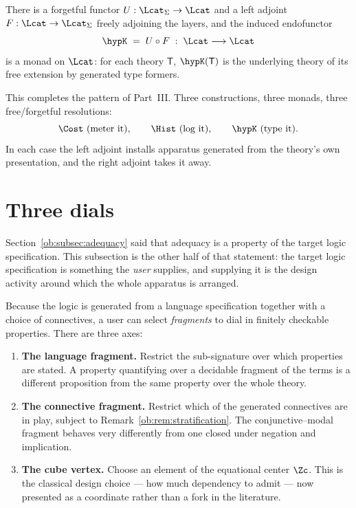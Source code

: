 \begin{proposition}
There is a forgetful functor $U : \Lcat_\Sigma \to \Lcat$ and a left adjoint
$F : \Lcat \to \Lcat_\Sigma$ freely adjoining the layers, and the induced endofunctor
\[
  \hypK \;=\; U \circ F \;:\; \Lcat \longrightarrow \Lcat
\]
is a monad on $\Lcat$: for each theory $\mathsf{T}$, $\hypK(\mathsf{T})$ is the underlying
theory of its free extension by generated type formers.
\end{proposition}

This completes the pattern of Part~III. Three constructions, three monads, three
free/forgetful resolutions:
\[
  \Cost \ \text{(meter it)}, \qquad
  \Hist \ \text{(log it)}, \qquad
  \hypK  \ \text{(type it)} .
\]
In each case the left adjoint installs apparatus generated from the theory's own
presentation, and the right adjoint takes it away.

\section{Three dials}
\label{ob:subsec:dials}

Section~\ref{ob:subsec:adequacy} said that adequacy is a property of the target logic
specification. This subsection is the other half of that statement: the target logic
specification is something the \emph{user} supplies, and supplying it is the design
activity around which the whole apparatus is arranged.

Because the logic is generated from a language specification together with a choice of
connectives, a user can select \emph{fragments} to dial in finitely checkable properties.
There are three axes:

\begin{enumerate}[label=(\arabic*),leftmargin=2.5em]
  \item \textbf{The language fragment.} Restrict the sub-signature over which properties
    are stated. A property quantifying over a decidable fragment of the terms is a
    different proposition from the same property over the whole theory.
  \item \textbf{The connective fragment.} Restrict which of the generated connectives are
    in play, subject to Remark~\ref{ob:rem:stratification}. The conjunctive--modal fragment
    behaves very differently from one closed under negation and implication.
  \item \textbf{The cube vertex.} Choose an element of the equational center $\Zc$. This
    is the classical design choice --- how much dependency to admit --- now presented as a
    coordinate rather than a fork in the literature.
\end{enumerate}

